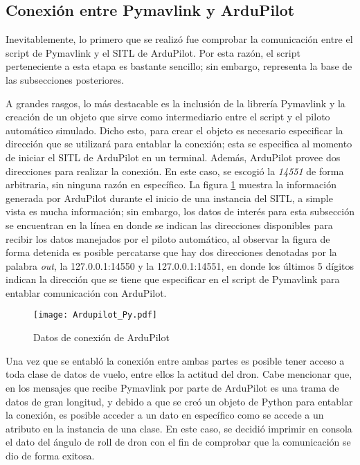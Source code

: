 \subsection{Conexión entre Pymavlink y ArduPilot}

Inevitablemente, lo primero que se realizó fue comprobar la comunicación entre el script de Pymavlink y el SITL de ArduPilot. Por esta razón, el script perteneciente a esta etapa es bastante sencillo; sin embargo, representa la base de las subsecciones posteriores.

A grandes rasgos, lo más destacable es la inclusión de la librería Pymavlink y la creación de un objeto que sirve como intermediario entre el script y el piloto automático simulado. Dicho esto, para crear el objeto es necesario especificar la dirección que se utilizará para entablar la conexión; esta se especifica al momento de iniciar el SITL de ArduPilot en un terminal. Además, ArduPilot provee dos direcciones para realizar la conexión. En este caso, se escogió la \textit{14551} de forma arbitraria, sin ninguna razón en específico. La figura \ref{fig:Ardupilot_Py} muestra la información generada por ArduPilot durante el inicio de una instancia del SITL, a simple vista es mucha información; sin embargo, los datos de interés para esta subsección se encuentran en la línea en donde se indican las direcciones disponibles para recibir los datos manejados por el piloto automático, al observar la figura de forma detenida es posible percatarse que hay dos direcciones denotadas por la palabra \textit{out}, la 127.0.0.1:14550 y la 127.0.0.1:14551, en donde los últimos 5 dígitos indican la dirección que se tiene que especificar en el script de Pymavlink para entablar comunicación con ArduPilot. 

\begin{figure}[ht]
    \centering
    \texttt{[image: Ardupilot\_Py.pdf]}
    \caption{Datos de conexión de ArduPilot}
    \label{fig:Ardupilot_Py}
\end{figure}

Una vez que se entabló la conexión entre ambas partes es posible tener acceso a toda clase de datos de vuelo, entre ellos la actitud del dron. Cabe mencionar que, en los mensajes que recibe Pymavlink por parte de ArduPilot es una trama de datos de gran longitud, y debido a que se creó un objeto de Python para entablar la conexión, es posible acceder a un dato en específico como se accede a un atributo en la instancia de una clase. En este caso, se decidió imprimir en consola el dato del ángulo de roll de dron con el fin de comprobar que la comunicación se dio de forma exitosa. 

